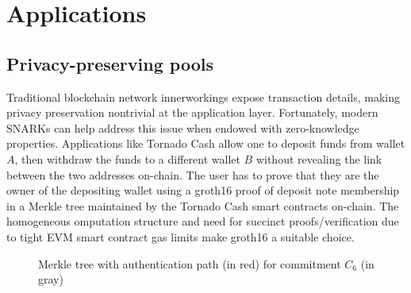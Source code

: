 \section{Applications}

\subsection{Privacy-preserving pools}
\noindent Traditional blockchain network innerworkings expose transaction details, making privacy preservation nontrivial at the application layer. Fortunately, modern SNARKs can help address this issue when endowed with zero-knowledge properties. Applications like Tornado Cash \cite{tornadocash} allow one to deposit funds from wallet $A$, then withdraw the funds to a different wallet $B$ without revealing the link between the two addresses on-chain. The user has to prove that they are the owner of the depositing wallet using a groth16 proof of deposit note membership in a Merkle tree maintained by the Tornado Cash smart contracts on-chain. The homogeneous omputation structure and need for succinct proofs/verification due to tight EVM smart contract gas limits make groth16 a suitable choice.  
\begin{figure}[t]
\centering
{}
\caption{Merkle tree with authentication path (in red) for commitment $C_6$ (in gray)}
\label{fig:merkle-tree}
\end{figure}

